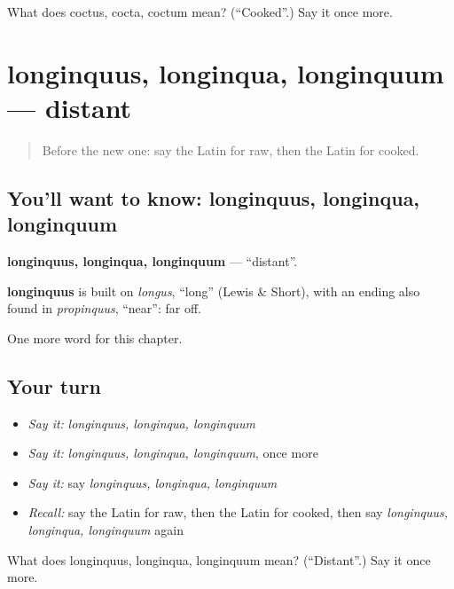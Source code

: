 \begin{tcolorbox}[breakable,colback=teal!4,colframe=teal!35!black,title={Before you move on}]
What does coctus, cocta, coctum mean? (\textquotedblleft{}Cooked\textquotedblright{}.) Say it once more.
\end{tcolorbox}
\section[longinquus, longinqua, longinquum]{longinquus, longinqua, longinquum — distant}

\label{lesson:LA-C181-longinquus}



\begin{quote}
Before the new one: say the Latin for raw, then the Latin for cooked.
\end{quote}

\subsection*{You'll want to know: longinquus, longinqua, longinquum}
\textbf{longinquus, longinqua, longinquum} — \textquotedblleft{}distant\textquotedblright{}.

\begin{cousinweb}
\textbf{longinquus} is built on \emph{longus}, \textquotedblleft{}long\textquotedblright{} (Lewis \& Short), with an ending also found in \emph{propinquus}, \textquotedblleft{}near\textquotedblright{}: far off.
\end{cousinweb}

\begin{grammarlens}[title={What you've built}]
One more word for this chapter.
\end{grammarlens}

\subsection*{Your turn}
\begin{itemize}
\raggedright
  \item \emph{Say it:} \emph{longinquus, longinqua, longinquum}
  \item \emph{Say it:} \emph{longinquus, longinqua, longinquum}, once more
  \item \emph{Say it:} say \emph{longinquus, longinqua, longinquum}
  \item \emph{Recall:} say the Latin for raw, then the Latin for cooked, then say \emph{longinquus, longinqua, longinquum} again
\end{itemize}

\begin{tcolorbox}[breakable,colback=teal!4,colframe=teal!35!black,title={Before you move on}]
What does longinquus, longinqua, longinquum mean? (\textquotedblleft{}Distant\textquotedblright{}.) Say it once more.
\end{tcolorbox}
